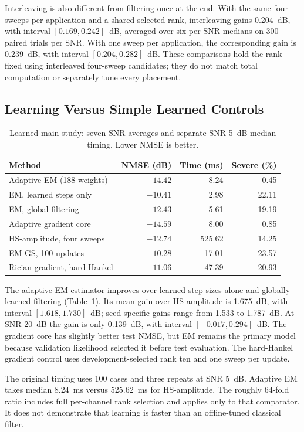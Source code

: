 \documentclass[10pt,journal,letterpaper]{IEEEtran}
\begin{document}
Interleaving is also different from filtering once at the end. With the same four sweeps per application and a shared selected rank, interleaving gains 0.204~dB, with interval $[0.169,0.242]$~dB, averaged over six per-SNR medians on 300 paired trials per SNR. With one sweep per application, the corresponding gain is 0.239~dB, with interval $[0.204,0.282]$~dB. These comparisons hold the rank fixed using interleaved four-sweep candidates; they do not match total computation or separately tune every placement.

\subsection{Learning Versus Simple Learned Controls}
\begin{table}[!t]
\caption{Learned main study: seven-SNR averages and separate SNR 5~dB median timing. Lower NMSE is better.}
\label{tab:learned}\centering\footnotesize\setlength{\tabcolsep}{3pt}
\begin{tabular}{@{}lrrr@{}}\toprule
Method & NMSE (dB) & Time (ms) & Severe (\%)\\\midrule
Adaptive EM (188 weights) & $-14.42$ & 8.24 & 0.45\\
EM, learned steps only & $-10.41$ & 2.98 & 22.11\\
EM, global filtering & $-12.43$ & 5.61 & 19.19\\
Adaptive gradient core & $-14.59$ & 8.00 & 0.85\\
HS-amplitude, four sweeps & $-12.74$ & 525.62 & 14.25\\
EM-GS, 100 updates & $-10.28$ & 17.01 & 23.57\\
Rician gradient, hard Hankel & $-11.06$ & 47.39 & 20.93\\\bottomrule
\end{tabular}
\end{table}
The adaptive EM estimator improves over learned step sizes alone and globally learned filtering (Table~\ref{tab:learned}). Its mean gain over HS-amplitude is 1.675~dB, with interval $[1.618,1.730]$~dB; seed-specific gains range from 1.533 to 1.787~dB. At SNR 20~dB the gain is only 0.139~dB, with interval $[-0.017,0.294]$~dB. The gradient core has slightly better test NMSE, but EM remains the primary model because validation likelihood selected it before test evaluation. The hard-Hankel gradient control uses development-selected rank ten and one sweep per update.

The original timing uses 100 cases and three repeats at SNR 5~dB. Adaptive EM takes median 8.24~ms versus 525.62~ms for HS-amplitude. The roughly 64-fold ratio includes full per-channel rank selection and applies only to that comparator. It does not demonstrate that learning is faster than an offline-tuned classical filter.
\end{document}
